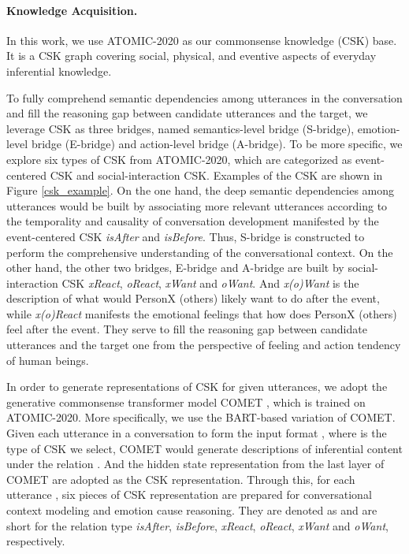 \documentclass[letterpaper]{article} \usepackage{aaai23}  \usepackage{times}  \usepackage{helvet}  \usepackage{courier}  \usepackage[hyphens]{url}  \usepackage{graphicx} \urlstyle{rm} \def\UrlFont{\rm}  \usepackage{natbib}  \usepackage{caption} \frenchspacing  \setlength{\pdfpagewidth}{8.5in} \setlength{\pdfpageheight}{11in} \usepackage{algorithm}
\begin{document}
\paragraph{Knowledge Acquisition.}
In this work, we use ATOMIC-2020 \cite{csk} as our commonsense knowledge (CSK) base. It is a CSK graph covering social, physical, and eventive aspects of everyday inferential knowledge.

To fully comprehend semantic dependencies among utterances in the conversation and fill the reasoning gap between candidate utterances and the target, we leverage CSK as three bridges, named semantics-level bridge (S-bridge), emotion-level bridge (E-bridge) and action-level bridge (A-bridge). To be more specific, we explore six types of CSK from ATOMIC-2020, which are categorized as event-centered CSK and social-interaction CSK. Examples of the CSK are shown in Figure \ref{csk_example}. On the one hand, the deep semantic dependencies among utterances would be built by associating more relevant utterances according to the temporality and causality of conversation development manifested by the event-centered CSK \emph{isAfter} and \emph{isBefore}. Thus, S-bridge is constructed to perform the comprehensive understanding of the conversational context. On the other hand, the other two bridges, E-bridge and A-bridge are built by social-interaction CSK \emph{xReact}, \emph{oReact}, \emph{xWant} and \emph{oWant}. And \emph{x(o)Want} is the description of what would PersonX (others) likely want to do after the event, while \emph{x(o)React} manifests the emotional feelings that how does PersonX (others) feel after the event. They serve to fill the reasoning gap between candidate utterances and the target one from the perspective of feeling and action tendency of human beings.

In order to generate representations of CSK for given utterances, we adopt the generative commonsense transformer model COMET \cite{comet}, which is trained on ATOMIC-2020. More specifically, we use the BART-based \cite{bart} variation of COMET. Given each utterance  in a conversation to form the input format , where  is the type of CSK we select, COMET would generate descriptions of inferential content under the relation . And the hidden state representation from the last layer of COMET are adopted as the CSK representation. Through this, for each utterance , six pieces of CSK representation are prepared for conversational context modeling and emotion cause reasoning. They are denoted as  and  are short for the relation type \emph{isAfter}, \emph{isBefore}, \emph{xReact}, \emph{oReact}, \emph{xWant} and \emph{oWant}, respectively.
\end{document}
